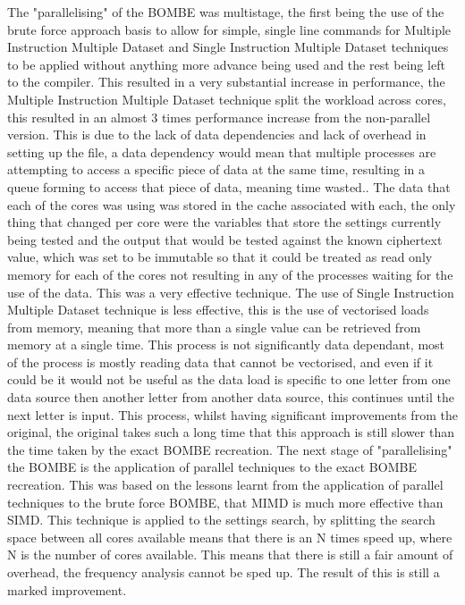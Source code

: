 \documentclass[12pt,a4paper]{article}
\begin{document}
The "parallelising" of the BOMBE was multistage, the first being the use of the brute force approach basis to allow for simple, single line commands for Multiple Instruction Multiple Dataset and Single Instruction Multiple Dataset techniques to be applied without anything more advance being used and the rest being left to the compiler. This resulted in a very substantial increase in performance, the Multiple Instruction Multiple Dataset technique split the workload across cores, this resulted in an almost 3 times performance increase from the non-parallel version. This is due to the lack of data dependencies and lack of overhead in setting up the file, a data dependency would mean that multiple processes are attempting to access a specific piece of data at the same time, resulting in a queue forming to access that piece of data, meaning time wasted.. The data that each of the cores was using was stored in the cache associated with each, the only thing that changed per core were the variables that store the settings currently being tested and the output that would be tested against the known ciphertext value, which was set to be immutable so that it could be treated as read only memory for each of the cores not resulting in any of the processes waiting for the use of the data. This was a very effective technique. The use of Single Instruction Multiple Dataset technique is less effective, this is the use of vectorised loads from memory, meaning that more than a single value can be retrieved from memory at a single time. This process is not significantly data dependant, most of the process is mostly reading data that cannot be vectorised, and even if it could be it would not be useful as the data load is specific to one letter from one data source then another letter from another data source, this continues until the next letter is input. This process, whilst having significant improvements from the original, the original takes such a long time that this approach is still slower than the time taken by the exact BOMBE recreation. The next stage of "parallelising" the BOMBE is the application of parallel techniques to the exact BOMBE recreation. This was based on the lessons learnt from the application of parallel techniques to the brute force BOMBE, that MIMD is much more effective than SIMD. This technique is applied to the settings search, by splitting the search space between all cores available means that there is an N times speed up, where N is the number of cores available. This means that there is still a fair amount of overhead, the frequency analysis cannot be sped up. The result of this is still a marked improvement.\\
\end{document}
